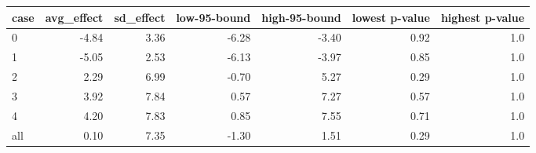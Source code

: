 \begin{tabular}{lrrrrrr}
\toprule
case &  avg\_effect &  sd\_effect &  low-95-bound &  high-95-bound &  lowest p-value &  highest p-value \\
\midrule
   0 &       -4.84 &       3.36 &         -6.28 &          -3.40 &            0.92 &              1.0 \\
   1 &       -5.05 &       2.53 &         -6.13 &          -3.97 &            0.85 &              1.0 \\
   2 &        2.29 &       6.99 &         -0.70 &           5.27 &            0.29 &              1.0 \\
   3 &        3.92 &       7.84 &          0.57 &           7.27 &            0.57 &              1.0 \\
   4 &        4.20 &       7.83 &          0.85 &           7.55 &            0.71 &              1.0 \\
 all &        0.10 &       7.35 &         -1.30 &           1.51 &            0.29 &              1.0 \\
\bottomrule
\end{tabular}
